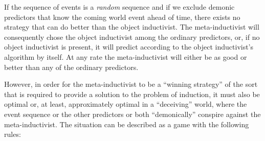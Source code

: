 \documentclass[12pt, a4paper]{article}
\numberwithin{equation}{section}
\begin{document}
If the sequence of events is a {\em random} sequence and if we exclude demonic
predictors that know the coming world event ahead of time, there exists no 
strategy that can do better than the object inductivist. The meta-inductivist
will consequently chose the object inductivist among the ordinary predictors, or,
if no object inductivist is present, it will predict according to the object
inductivist's algorithm by itself. At any rate the meta-inductivist will either
be as good or better than any of the ordinary predictors.

However, in order for the meta-inductivist to be a ``winning strategy'' of the
sort that is required to provide a solution to the problem of induction, it must
also be optimal or, at least, approximately optimal in a ``deceiving''
world, where the event sequence or the other predictors or both ``demonically''
conspire against the meta-inductivist. The situation can be described as a game
with the following rules:
\end{document}
